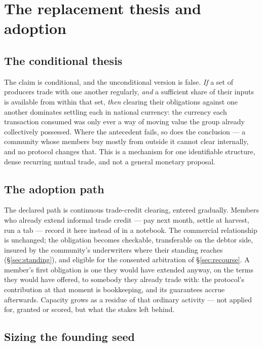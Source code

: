 \section{The replacement thesis and adoption}
\label{sec:adoption}

\subsection{The conditional thesis}

The claim is conditional, and the unconditional version is false. \emph{If} a set of
producers trade with one another regularly, \emph{and} a sufficient share of their inputs
is available from within that set, \emph{then} clearing their obligations against one
another dominates settling each in national currency: the currency each transaction
consumed was only ever a way of moving value the group already collectively possessed.
Where the antecedent fails, so does the conclusion --- a community whose members buy
mostly from outside it cannot clear internally, and no protocol changes that. This is a
mechanism for one identifiable structure, dense recurring mutual trade, and not a general
monetary proposal.

\subsection{The adoption path}

The declared path is continuous trade-credit clearing, entered gradually. Members who
already extend informal trade credit --- pay next month, settle at harvest, run a tab ---
record it here instead of in a notebook. The commercial relationship is unchanged; the
obligation becomes checkable, transferable on the debtor side, insured by the community's
underwriters where their standing reaches (\S\ref{sec:standing}), and eligible for the
consented arbitration of \S\ref{sec:recourse}. A member's first obligation is one they
would have extended anyway, on the terms they would have offered, to somebody they already
trade with: the protocol's contribution at that moment is bookkeeping, and its guarantees
accrue afterwards. Capacity grows as a residue of that ordinary activity --- not applied
for, granted or scored, but what the stakes left behind.

\subsection{Sizing the founding seed}
\label{sec:seedsizing}

